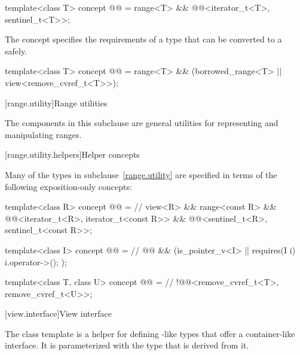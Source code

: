 \begin{itemdecl}
template<class T>
  concept @@ =
    range<T> && @@<iterator_t<T>, sentinel_t<T>>;
\end{itemdecl}

\pnum
The  concept specifies the requirements of a
 type that can be converted to a  safely.

\begin{itemdecl}
template<class T>
  concept @@ =
    range<T> && (borrowed_range<T> || view<remove_cvref_t<T>>);
\end{itemdecl}

[range.utility]{Range utilities}

\pnum
The components in this subclause are general utilities for representing and
manipulating ranges.

[range.utility.helpers]{Helper concepts}

\pnum
Many of the types in subclause~\ref{range.utility} are specified in terms of
the following exposition-only concepts:

\begin{codeblock}
template<class R>
  concept @@ =                         // \expos
    view<R> && range<const R> &&
    @@<iterator_t<R>, iterator_t<const R>> &&
    @@<sentinel_t<R>, sentinel_t<const R>>;

template<class I>
  concept @@ =                           // \expos
    @@ && (is_pointer_v<I> || requires(I i) { i.operator->(); });

template<class T, class U>
  concept @@ =                         // \expos
    !@@<remove_cvref_t<T>, remove_cvref_t<U>>;
\end{codeblock}

[view.interface]{View interface}

\pnum
The class template  is a helper for defining
-like types that offer a container-like interface. It is
parameterized with the type that is derived from it.

